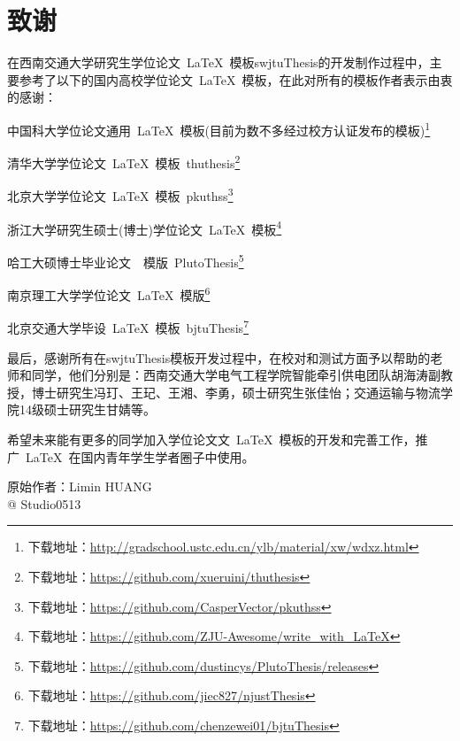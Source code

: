 \chapter*{致\qquad{}谢}

在西南交通大学研究生学位论文~\LaTeX{}~模板swjtuThesis的开发制作过程中，主要参考了以下的国内高校学位论文~\LaTeX{}~模板，在此对所有的模板作者表示由衷的感谢：
\begin{compactitem}
	\item 中国科大学位论文通用~\LaTeX{}~模板(目前为数不多经过校方认证发布的模板)\footnote{下载地址：\url{http://gradschool.ustc.edu.cn/ylb/material/xw/wdxz.html}}
	\item 清华大学学位论文~\LaTeX{}~模板~thuthesis\footnote{下载地址：\url{https://github.com/xueruini/thuthesis}}
	\item 北京大学学位论文~\LaTeX{}~模板~pkuthss\footnote{下载地址：\url{https://github.com/CasperVector/pkuthss}}
	\item 浙江大学研究生硕士(博士)学位论文~\LaTeX{}~模板\footnote{下载地址：\url{https://github.com/ZJU-Awesome/write_with_LaTeX}}
	\item 哈工大硕博士毕业论文~\XeLaTeX{}~模版~PlutoThesis\footnote{下载地址：\url{https://github.com/dustincys/PlutoThesis/releases}}
	\item 南京理工大学学位论文~\LaTeX{}~模版\footnote{下载地址：\url{https://github.com/jiec827/njustThesis}}
	\item 北京交通大学毕设~\LaTeX{}~模板~bjtuThesis\footnote{下载地址：\url{https://github.com/chenzewei01/bjtuThesis}}
\end{compactitem}

\par
最后，感谢所有在swjtuThesis模板开发过程中，在校对和测试方面予以帮助的老师和同学，他们分别是：西南交通大学电气工程学院智能牵引供电团队胡海涛副教授，博士研究生冯玎、王玘、王湘、李勇，硕士研究生张佳怡；交通运输与物流学院14级硕士研究生甘婧等。

\par
希望未来能有更多的同学加入学位论文文~\LaTeX{}~模板的开发和完善工作，推广~\LaTeX{}~在国内青年学生学者圈子中使用。

\vspace{25mm}
\begin{flushright}
	原始作者：Limin HUANG \\
	@ Studio0513
\end{flushright}
